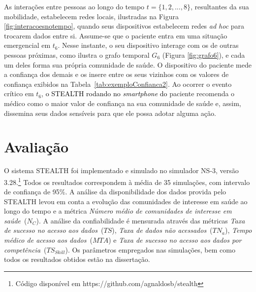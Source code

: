 \documentclass[12pt]{article}
\newcommand{\as}[1]{\textcolor{blue}{{\bf #1}}}
\newcommand{\rev}[1]{\textcolor{black}{{#1}}}
\begin{document}

As interações entre pessoas ao longo do tempo $t = \{1,2,...,8\}$, resultantes da sua mobilidade, estabelecem redes locais, ilustradas na Figura \ref{fig:interacoesnotempo}, quando seus dispositivos estabelecem redes \textit{ad hoc} para trocarem dados entre si. Assume-se que o paciente entra em uma situação emergencial em $t_6$. Nesse instante, o seu dispositivo interage com os de outras pessoas próximas, como ilustra o grafo temporal $G_6$ (Figura \ref{fig:grafo6}), e cada um deles forma sua própria comunidade de saúde. O dispositivo do paciente mede a confiança dos demais e os insere entre os seus 
vizinhos com os valores de confiança exibidos na  Tabela~\ref{tab:exemploConfianca2}. Ao ocorrer o evento crítico em $t_6$, \rev{o STEALTH rodando no \textit{smartphone} do} paciente recomenda o médico como 
o maior valor de confiança na sua comunidade de saúde e, assim, dissemina seus dados sensíveis
para
que ele possa
adotar
alguma ação.

\section{Avaliação} %
\label{sec:aval}

O sistema \mbox{STEALTH} foi implementado e simulado no simulador NS-3, versão 3.28.\footnote{Código disponível em https://github.com/agnaldosb/stealth}
Todos os resultados correspondem à média de 35 simulações, com intervalo de confiança de 95\%. 
A análise da disponibilidade dos dados provida pelo \mbox{STEALTH} levou em conta a evolução das comunidades de interesse em saúde ao longo do tempo e a métrica \textit{Número médio de comunidades de interesse em saúde}~($N_{C}$). A análise da confiabilidade é mensurada através das métricas \textit{Taxa de sucesso no acesso aos dados}~($TS$), \textit{Taxa de dados não acessados}~($TN_a$), \textit{Tempo médico de acesso aos dados}~($MTA$) e \textit{Taxa de sucesso no acesso aos dados por competência}~($TS_{Skill}$).
Os parâmetros empregados nas simulações, bem como todos os resultados obtidos estão na dissertação.
\end{document}
